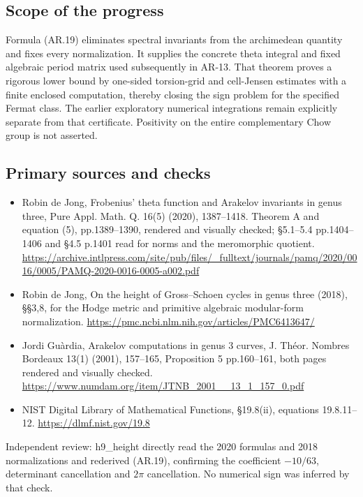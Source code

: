 \documentclass[11pt,a4paper]{article}
\providecommand{\tightlist}{\setlength{\itemsep}{0pt}\setlength{\parskip}{0pt}}
\begin{document}
\subsection{Scope of the progress}\label{scope-of-the-progress}

Formula (AR.19) eliminates spectral invariants from the archimedean
quantity and fixes every normalization. It supplies the concrete theta
integral and fixed algebraic period matrix used subsequently in AR-13.
That theorem proves a rigorous lower bound by one-sided torsion-grid and
cell-Jensen estimates with a finite enclosed computation, thereby
closing the sign problem for the specified Fermat class. The earlier
exploratory numerical integrations remain explicitly separate from that
certificate. Positivity on the entire complementary Chow group is not
asserted.

\subsection{Primary sources and
checks}\label{primary-sources-and-checks}

\begin{itemize}
\tightlist
\item
  Robin de Jong, Frobenius' theta function and Arakelov invariants in
  genus three, Pure Appl. Math. Q. 16(5) (2020), 1387--1418. Theorem A
  and equation (5), pp.1389--1390, rendered and visually checked;
  §5.1--5.4 pp.1404--1406 and §4.5 p.1401 read for norms and the
  meromorphic quotient.
  \url{https://archive.intlpress.com/site/pub/files/_fulltext/journals/pamq/2020/0016/0005/PAMQ-2020-0016-0005-a002.pdf}
\item
  Robin de Jong, On the height of Gross--Schoen cycles in genus three
  (2018), §§3,8, for the Hodge metric and primitive algebraic
  modular-form normalization.
  \url{https://pmc.ncbi.nlm.nih.gov/articles/PMC6413647/}
\item
  Jordi Guàrdia, Arakelov computations in genus 3 curves, J. Théor.
  Nombres Bordeaux 13(1) (2001), 157--165, Proposition 5 pp.160--161,
  both pages rendered and visually checked.
  \url{https://www.numdam.org/item/JTNB_2001__13_1_157_0.pdf}
\item
  NIST Digital Library of Mathematical Functions, §19.8(ii), equations
  19.8.11--12. \url{https://dlmf.nist.gov/19.8}
\end{itemize}

Independent review: h9\_height directly read the 2020 formulas and 2018
normalizations and rederived (AR.19), confirming the coefficient
\(-10/63\), determinant cancellation and \(2\pi\) cancellation. No
numerical sign was inferred by that check.
\end{document}
